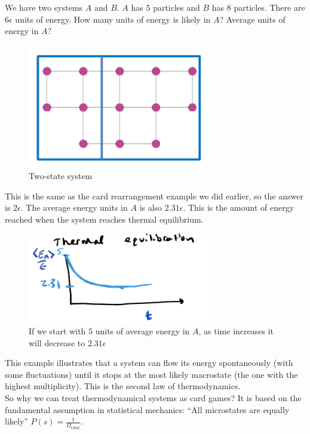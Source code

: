 \begin{texample}
	We have two systems $A$ and $B$. $A$ has $5$ particles and $B$ has $8$ particles. There are $6\epsilon$ units of energy. How many units of energy is likely in $A$? Average units of energy in $A$? \\
	
	\begin{figure}[H]
		\centering
		\includegraphics[width=80mm]{7.png}
		\caption{Two-state system}
	\end{figure}
	
	This is the same as the card rearrangement example we did earlier, so the answer is $2\epsilon$. The average energy units in $A$ is also $2.31\epsilon$. This is the amount of energy reached when the system reaches thermal equilibrium.
	
	\begin{figure}[H]
		\centering
		\includegraphics[width=80mm]{10.png}
		\caption{If we start with $5$ units of average energy in $A$, as time increases it will decrease to $2.31\epsilon$}
	\end{figure}
	
	This example illustrates that a system can flow its energy spontaneously (with some fluctuations) until it stops at the most likely macrostate (the one with the highest multiplicity). This is the second law of thermodynamics. \\
	
	So why we can treat thermodynamical systems as card games? It is based on the fundamental assumption in statistical mechanics: ``All microstates are equally likely'' $P(s)=\frac{1}{\Omega_{total}}$.
\end{texample}

